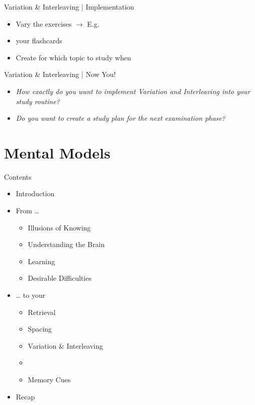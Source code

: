 \documentclass{ercisbeamer}
\begin{document}
\begin{frame}{Variation \& Interleaving | Implementation}
    \begin{itemize}
        \item Vary the exercises $\rightarrow$ E.g. 
        \item {} your flashcards
        \item Create  for which topic to study when 
    \end{itemize}
\end{frame}

\begin{frame}{Variation \& Interleaving | Now You!}
    \begin{itemize}
        \item \emph{How exactly do you want to implement Variation and Interleaving into your study routine?}
        \item \emph{Do you want to create a study plan for the next examination phase?}
    \end{itemize}
\end{frame}

\section{Mental Models}
\begin{frame}{Contents}
    \begin{itemize}
        \item Introduction
        \item From …
        \begin{itemize}
            \item Illusions of Knowing
            \item Understanding the Brain
            \item Learning
            \item Desirable Difficulties
        \end{itemize}
        \item … to your 
        \begin{itemize}
            \item Retrieval
            \item Spacing
            \item Variation \& Interleaving
            \item {}
            \item Memory Cues
        \end{itemize}
        \item Recap
    \end{itemize}
\end{frame}
\end{document}
